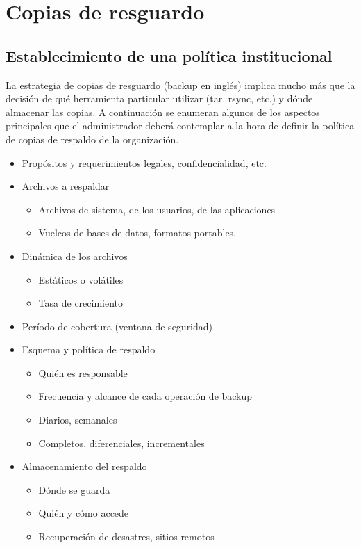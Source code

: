 \section{Copias de resguardo}
\subsection{Establecimiento de una política institucional}
La estrategia de copias de resguardo (backup en inglés)  implica mucho más que la decisión 
de qué herramienta particular utilizar (tar, rsync, etc.)  y dónde almacenar las copias.  A continuación 
se enumeran algunos de los aspectos principales que el administrador deberá contemplar a la hora de definir 
la política de copias de respaldo de la organización.

\begin{itemize}
	\item Propósitos y requerimientos legales, confidencialidad, etc.
	\item Archivos a respaldar 
	\begin{itemize}
		\item Archivos de sistema, de los usuarios, de las aplicaciones
		\item Vuelcos de bases de datos, formatos portables.
	\end{itemize}	
	\item Dinámica de los archivos
	\begin{itemize}
		\item Estáticos o volátiles 
		\item Tasa de crecimiento 
	\end{itemize}
	\item Período de cobertura (ventana de seguridad)
	\item Esquema y política de respaldo 
	\begin{itemize}
		\item Quién es responsable
		\item Frecuencia y alcance de cada operación de backup
		\item Diarios, semanales
		\item Completos, diferenciales, incrementales
	\end{itemize}
	\item Almacenamiento del respaldo 
	\begin{itemize}
		\item Dónde se guarda
		\item Quién y cómo accede
		\item Recuperación de desastres, sitios remotos

\end{itemize}
\end{itemize}
